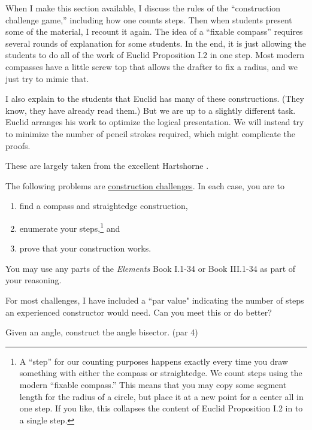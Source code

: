 \begin{annotation}
{
\color{blue}
When I make this section available, I discuss the rules of the ``construction challenge game,'' including how one counts steps. Then when students present some of the material, I recount it again. The idea of a ``fixable compass'' requires several rounds of explanation for some students. In the end, it is just allowing the students to do all of the work of Euclid Proposition I.2 in one step. Most modern compasses have a little screw top that allows the drafter to fix a radius, and we just try to mimic that.

I also explain to the students that Euclid has many of these constructions. (They know, they have already read them.) But we are up to a slightly different task. Euclid arranges his work to optimize the logical presentation. We will instead try to minimize the number of pencil strokes required, which might complicate the proofs.

These are largely taken from the excellent Hartshorne \cite{Hartshorne}.
}
\end{annotation}

The following problems are \underline{construction challenges}. In each case, you are to
\begin{enumerate}
\item find a compass and straightedge construction,
\item enumerate your steps,\footnote{A ``step'' for our counting purposes happens exactly every time you draw something with either the compass or straightedge.
We count steps using the modern ``fixable compass.''
This means that you may copy some segment length for the radius of a circle, but place it at a new point for a center all in one step.
If you like, this collapses the content of Euclid Proposition I.2 in to a single step.} and
\item prove that your construction works.
\end{enumerate}
You may use any parts of the \emph{Elements} Book I.1-34 or Book III.1-34 as part of your reasoning.



For most challenges, I have included a ``par value" indicating the number of steps an experienced constructor would need.
Can you meet this or do better?


\begin{challenge}\label{chal:angle-bisector}
Given an angle, construct the angle bisector. (par 4)
\end{challenge}

